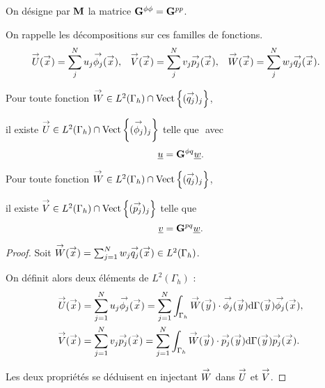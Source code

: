   \begin{defn}
    On désigne par \(\mM\) la matrice \(\mG{\phi}{\phi} = \mG{p}{p}\).
  \end{defn}

  On rappelle les décompositions sur ces familles de fonctions.
  \begin{align*}
    \vect{U}(\vx) &= \sum_j^N  u_j \phij(\vx),
    &
    \vect{V}(\vx) &= \sum_j^N  v_j \pj(\vx),
    &
    \vect{W}(\vx) &= \sum_j^N  w_j \qj(\vx).
  \end{align*}

  \begin{prop}
    Pour toute fonction \(\vect{W} \in L^2(\Gamma_h)\cap\Vect{(\qj)_j}\),

    il existe \(\vect{U} \in L^2(\Gamma_h) \cap \Vect{(\phij)_j} \) telle que \(\) avec
    \begin{equation*}
      \comp{u} = \mG{\phi}{q}\comp{w}.
    \end{equation*}
  \end{prop}

  \begin{prop}
    Pour toute fonction \(\vect{W} \in L^2(\Gamma_h)\cap\Vect{(\qj)_j}\),

    il existe \(\vect{V} \in L^2(\Gamma_h) \cap \Vect{(\pj)_j} \) telle que
    \begin{equation*}
      \comp{v} = \mG{p}{q}\comp{w}.
    \end{equation*}
  \end{prop}

  \begin{proof}
    Soit  \(\vect{W}(\vx) = \sum_{j=1}^N w_j \qj(\vx) \in L^2(\Gamma_h)\).

    On définit alors deux éléments de \(L^2(\Gamma_h)\) :
    \begin{align*}
      \vect{U}(\vx) &= \sum_{j=1}^N u_j \phij(\vx) = \sum_{j=1}^N \int_{\Gamma_h}\vect{W}(\vy)\cdot\phij(\vy)\dd{\Gamma}(\vy) \phij(\vx),
      \\
      \vect{V}(\vx) &= \sum_{j=1}^N v_j \pj(\vx) = \sum_{j=1}^N \int_{\Gamma_h}\vect{W}(\vy)\cdot\pj(\vy)\dd{\Gamma}(\vy) \pj(\vx).
    \end{align*}

    Les deux propriétés se déduisent en injectant \(\vect{W}\) dans \(\vect{U}\) et \(\vect{V}\).
  \end{proof}




